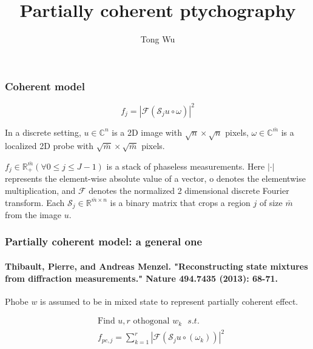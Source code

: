 \documentclass[UTF8]{beamer}
\author{Tong Wu}
\title{Partially coherent ptychography}
\begin{document}
\frame{\titlepage}
\tableofcontents


\begin{frame}[c]\frametitle{Coherent model}


\begin{equation}
\label{basic}
f_{j}=\left|\mathcal{F}\left( \mathcal{S}_{j} u  \circ \omega \right)\right|^{2} 
\end{equation}

In a discrete setting, $u \in \mathbb{C}^{n}$ is a 2D image with $\sqrt{n} \times \sqrt{n}$ pixels, $\omega \in \mathbb{C}^{\bar{m}}$ is a localized 2D probe with $\sqrt{\bar{m}} \times \sqrt{\bar{m}}$ pixels.

$f_{j} \in \mathbb{R}_{+}^{\bar{m}}(\forall 0 \leq j \leq J-1)$ is a stack of phaseless measurements. Here $|\cdot|$ represents the element-wise absolute value of a vector, o denotes the elementwise multiplication, and $\mathcal{F}$ denotes the normalized 2 dimensional discrete Fourier transform. Each $\mathcal{S}_{j} \in \mathbb{R}^{\bar{m} \times n}$ is a binary matrix that crops a region $j$ of size $\bar{m}$ from the image $u$.


\end{frame}

\begin{frame}[c]\frametitle{Partially coherent model: a general one}
\framesubtitle{Thibault, Pierre, and Andreas Menzel. "Reconstructing state mixtures from diffraction measurements." Nature 494.7435 (2013): 68-71.}




Phobe $w$ is assumed to be in mixed state to represent partially coherent effect.

\begin{equation}
\label{sep} 
\begin{aligned}
&\mbox{Find } u, r \mbox{ othogonal $w_k$   }s.t. \\
&f_{p c, j}=\sum_{k=1}^r \left|\mathcal{F}\left( \mathcal{S}_{j} u \circ \left(\omega_k\right) \right)\right|^{2}  
\end{aligned}
\end{equation}


\end{frame}
\end{document}
